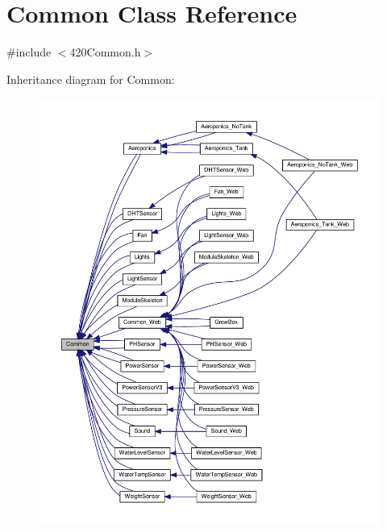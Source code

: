 \hypertarget{class_common}{}\section{Common Class Reference}
\label{class_common}


{\ttfamily \#include $<$420\+Common.\+h$>$}



Inheritance diagram for Common\+:
\nopagebreak
\begin{figure}[H]
\begin{center}
\leavevmode
\includegraphics[width=350pt]{class_common__inherit__graph}
\end{center}
\end{figure}

